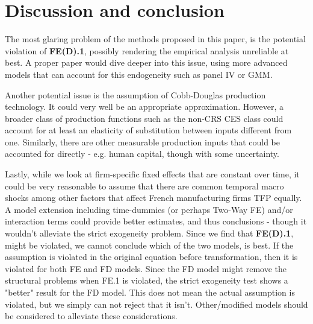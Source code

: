 \section{Discussion and conclusion}

The most glaring problem of the methods proposed in this paper, is the potential violation of \textbf{FE(D).1}, possibly rendering the empirical analysis unreliable at best. A proper paper would dive deeper into this issue, using more advanced models that can account for this endogeneity such as panel IV or GMM. 

Another potential issue is the assumption of Cobb-Douglas production technology. It could very well be an appropriate approximation. %
However, a broader class of production functions such as the non-CRS CES class could account for at least an elasticity of substitution between inputs different from one. Similarly, there are other measurable production inputs that could be accounted for directly - e.g. human capital, though with some uncertainty. 

Lastly, while we look at firm-specific fixed effects that are constant over time, it could be very reasonable to assume that there are common temporal macro shocks among other factors that affect French manufacturing firms TFP equally. A model extension including time-dummies (or perhaps Two-Way FE) and/or interaction terms could provide better estimates, and thus conclusions - though it wouldn't alleviate the strict exogeneity problem. Since we find that \textbf{FE(D).1}, might be violated, we cannot conclude which of the two models, is best. If the assumption is violated in the original equation before transformation, then it is violated for both FE and FD models. Since the FD model might remove the structural problems when FE.1 is violated, the strict exogeneity test shows a "better" result for the FD model. This does not mean the actual assumption is violated, but we simply can not reject that it isn't. Other/modified models should be considered to alleviate these considerations.





